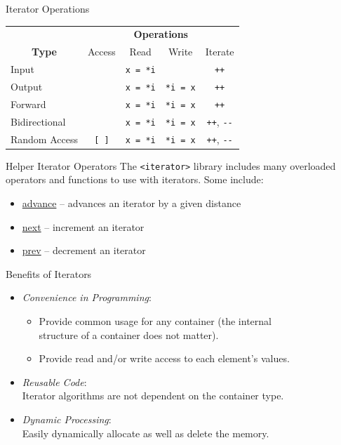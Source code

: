 \documentclass[14pt,aspectratio=1610]{beamer}
\begin{document}
\begin{frame}[fragile]{Iterator Operations}
\begin{center}\large
\begin{tabular} {l c c c c}
 & \multicolumn{4}{c}{\bfseries Operations}\\
\multicolumn{1}{c}{\bfseries Type} & {Access} & {Read} & {Write} & {Iterate}\\
Input         &               & \lstinline$x = *i$ &               &  \lstinline$++$\\
Output        &               & \lstinline$x = *i$ &  \lstinline$*i = x$ &  \lstinline$++$\\
Forward       &               & \lstinline$x = *i$ &  \lstinline$*i = x$ &  \lstinline$++$\\
Bidirectional &               & \lstinline$x = *i$ &  \lstinline$*i = x$ &  \lstinline$++$, \lstinline$--$\\
Random Access &\lstinline$[ ]$ & \lstinline$x = *i$ &  \lstinline$*i = x$ &  \lstinline$++$, \lstinline$--$\\
\end{tabular}
\end{center}
\end{frame}

\begin{frame}[fragile]{Helper Iterator Operators}
  The \lstinline|<iterator>| library includes many overloaded operators and functions to use with iterators. Some include:
  \begin{itemize}
    \item \href{https://en.cppreference.com/w/cpp/iterator/advance}{advance} -- advances an iterator by a given distance
    \item \href{https://en.cppreference.com/w/cpp/iterator/next}{next} -- increment an iterator
    \item \href{https://en.cppreference.com/w/cpp/iterator/prev}{prev} -- decrement an iterator 
  \end{itemize} 

\end{frame}

\begin{frame}{Benefits of Iterators}
\begin{itemize}\setlength\itemsep{0.5em}
\item<2->
  \emph{Convenience in Programming}:
  \begin{itemize}
  \item
    Provide common usage for any container (the internal\\ structure of a container does not matter).
  \item
    Provide read and/or write access to each element's values.
  \end{itemize}
\item<3->
  \emph{Reusable Code}:\\
  Iterator algorithms are not dependent on the container type.
\item<4->
  \emph{Dynamic Processing}:\\
  Easily dynamically allocate as well as delete the memory.
\end{itemize}
\end{frame}
\end{document}
